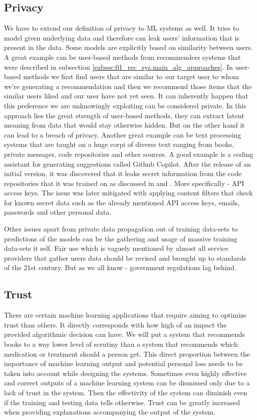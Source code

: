 \subsection{Privacy}
We have to extend our definition of privacy to ML systems as well. It tries to model given underlying data and therefore can leak users' information that is present in the data. Some models are explicitly based on similarity between users. A great example can be user-based methods from recommenders systems that were described in subsection \ref{subsec:01_rec_sys.main_alg_approaches}. In user-based methods we first find users that are similar to our target user to whom we're generating a recommendation and then we recommend those items that the similar users liked and our user have not yet seen. It can inherently happen that this preference we are unknowingly exploiting can be considered private. In this approach lies the great strength of user-based methods, they can extract latent meaning from data that would stay otherwise hidden. But on the other hand it can lead to a breach of privacy. Another great example can be text processing systems that are taught on a huge corpi of diverse text ranging from books, private messages, code repositories and other sources. A good example is a coding assistant for generating suggestions called Github Copilot. After the release of an initial version, it was discovered that it leaks secret information from the code repositories that it was trained on as discussed in \cite{github_copilot_leaks_2} and \cite{github_copilot_leaks}. More specifically - API access keys. The issue was later mitigated with applying content filters that check for known secret data such as the already mentioned API access keys, emails, passwords and other personal data.

Other issues apart from private data propagation out of training data-sets to predictions of the models can be the gathering and usage of massive training data-sets it self. Fair use which is vaguely mentioned by almost all service providers that gather users data should be revised and brought up to standards of the 21st century. But as we all know - government regulations lag behind.

\subsection{Trust}
There are certain machine learning applications that require aiming to optimize trust than others. It directly corresponds with how high of an impact the provided algorithmic decision can have. We will put a system that recommends books to a way lower level of scrutiny than a system that recommends which medication or treatment should a person get. This direct proportion between the importance of machine learning output and potential personal loss needs to be taken into account while designing the systems. Sometimes even highly effective and correct outputs of a machine learning system can be dismissed only due to a lack of trust in the system. Then the effectivity of the system can diminish even if the training and testing data tells otherwise. Trust can be greatly increased when providing explanations accompanying the output of the system.

